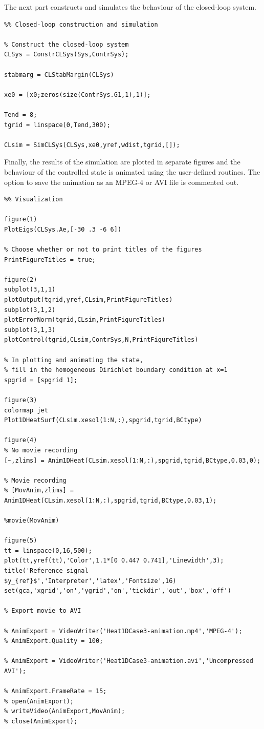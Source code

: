 \documentclass[11pt, a4paper]{amsart}
\theoremstyle{definition}
\numberwithin{equation}{section}
\begin{document}
The next part constructs and simulates the behaviour of the closed-loop system.

\begin{lstlisting}
%% Closed-loop construction and simulation

% Construct the closed-loop system
CLSys = ConstrCLSys(Sys,ContrSys);

stabmarg = CLStabMargin(CLSys)

xe0 = [x0;zeros(size(ContrSys.G1,1),1)];

Tend = 8;
tgrid = linspace(0,Tend,300);

CLsim = SimCLSys(CLSys,xe0,yref,wdist,tgrid,[]);
\end{lstlisting}

Finally, the results of the simulation are plotted in separate figures and the behaviour of the controlled state is animated using the user-defined routines. The option to save the animation as an MPEG-4 or AVI file is commented out.

\begin{lstlisting}
%% Visualization

figure(1)
PlotEigs(CLSys.Ae,[-30 .3 -6 6])

% Choose whether or not to print titles of the figures
PrintFigureTitles = true;

figure(2)
subplot(3,1,1)
plotOutput(tgrid,yref,CLsim,PrintFigureTitles)
subplot(3,1,2)
plotErrorNorm(tgrid,CLsim,PrintFigureTitles)
subplot(3,1,3)
plotControl(tgrid,CLsim,ContrSys,N,PrintFigureTitles)

% In plotting and animating the state,
% fill in the homogeneous Dirichlet boundary condition at x=1
spgrid = [spgrid 1];

figure(3)
colormap jet
Plot1DHeatSurf(CLsim.xesol(1:N,:),spgrid,tgrid,BCtype)

figure(4)
% No movie recording
[~,zlims] = Anim1DHeat(CLsim.xesol(1:N,:),spgrid,tgrid,BCtype,0.03,0);

% Movie recording
% [MovAnim,zlims] = Anim1DHeat(CLsim.xesol(1:N,:),spgrid,tgrid,BCtype,0.03,1);

%movie(MovAnim)

figure(5)
tt = linspace(0,16,500);
plot(tt,yref(tt),'Color',1.1*[0 0.447 0.741],'Linewidth',3);
title('Reference signal $y_{ref}$','Interpreter','latex','Fontsize',16)
set(gca,'xgrid','on','ygrid','on','tickdir','out','box','off')

% Export movie to AVI

% AnimExport = VideoWriter('Heat1DCase3-animation.mp4','MPEG-4');
% AnimExport.Quality = 100;

% AnimExport = VideoWriter('Heat1DCase3-animation.avi','Uncompressed AVI');

% AnimExport.FrameRate = 15;
% open(AnimExport);
% writeVideo(AnimExport,MovAnim);
% close(AnimExport);
\end{lstlisting}
\end{document}
